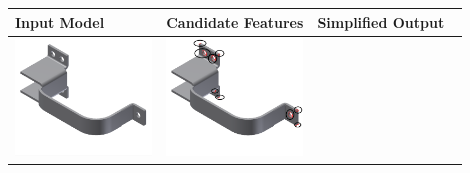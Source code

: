 \begin{minipage}[t]{0.9\linewidth}
\begin{tabular}[h]{@{} p{0.3\linewidth} | p{0.3\linewidth} | p{0.3\linewidth}@{}} \toprule

\textbf{Input Model} & \textbf{Candidate Features} & \textbf{Simplified Output} \\ \midrule

\includegraphics[width=0.98\linewidth]{..//Common/images/DefeatBracketPhase_I_1} &
\includegraphics[width=0.98\linewidth]{..//Common/images/DefeatBracketPhase_I_2_circled} &

\end{tabular}
\end{minipage}
